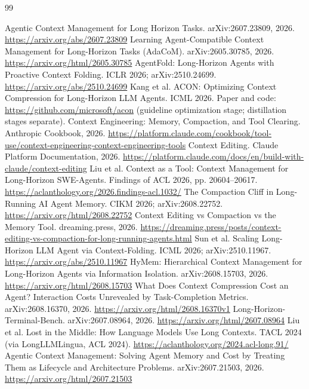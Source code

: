\documentclass[11pt]{article}
\begin{document}
\begin{thebibliography}{99}\small

 Agentic Context Management for Long Horizon Tasks. arXiv:2607.23809, 2026. \url{https://arxiv.org/abs/2607.23809}
 Learning Agent-Compatible Context Management for Long-Horizon Tasks (AdaCoM). arXiv:2605.30785, 2026. \url{https://arxiv.org/html/2605.30785}
 AgentFold: Long-Horizon Agents with Proactive Context Folding. ICLR 2026; arXiv:2510.24699. \url{https://arxiv.org/abs/2510.24699}
 Kang et al. ACON: Optimizing Context Compression for Long-Horizon LLM Agents. ICML 2026. Paper and code: \url{https://github.com/microsoft/acon} (guideline optimization stage; distillation stages separate).
 Context Engineering: Memory, Compaction, and Tool Clearing. Anthropic Cookbook, 2026. \url{https://platform.claude.com/cookbook/tool-use/context-engineering-context-engineering-tools}
 Context Editing. Claude Platform Documentation, 2026. \url{https://platform.claude.com/docs/en/build-with-claude/context-editing}
 Liu et al. Context as a Tool: Context Management for Long-Horizon SWE-Agents. Findings of ACL 2026, pp. 20604--20617. \url{https://aclanthology.org/2026.findings-acl.1032/}
 The Compaction Cliff in Long-Running AI Agent Memory. CIKM 2026; arXiv:2608.22752. \url{https://arxiv.org/html/2608.22752}
 Context Editing vs Compaction vs the Memory Tool. dreaming.press, 2026. \url{https://dreaming.press/posts/context-editing-vs-compaction-for-long-running-agents.html}
 Sun et al. Scaling Long-Horizon LLM Agent via Context-Folding. ICML 2026; arXiv:2510.11967. \url{https://arxiv.org/abs/2510.11967}
 HyMem: Hierarchical Context Management for Long-Horizon Agents via Information Isolation. arXiv:2608.15703, 2026. \url{https://arxiv.org/html/2608.15703}
 What Does Context Compression Cost an Agent? Interaction Costs Unrevealed by Task-Completion Metrics. arXiv:2608.16370, 2026. \url{https://arxiv.org/html/2608.16370v1}
 Long-Horizon-Terminal-Bench. arXiv:2607.08964, 2026. \url{https://arxiv.org/html/2607.08964}
 Liu et al. Lost in the Middle: How Language Models Use Long Contexts. TACL 2024 (via LongLLMLingua, ACL 2024). \url{https://aclanthology.org/2024.acl-long.91/}
 Agentic Context Management: Solving Agent Memory and Cost by Treating Them as Lifecycle and Architecture Problems. arXiv:2607.21503, 2026. \url{https://arxiv.org/html/2607.21503}

\end{thebibliography}
\end{document}
